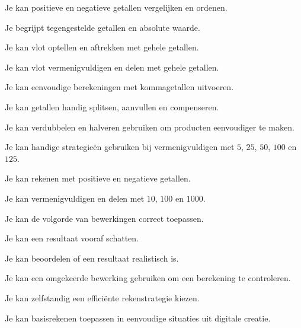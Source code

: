 \documentclass{ximera}
\begin{document}
\begin{leerdoelen}

    \item Je kan positieve en negatieve getallen vergelijken en ordenen.

    \item Je begrijpt tegengestelde getallen en absolute waarde.

    \item Je kan vlot optellen en aftrekken met gehele getallen.

    \item Je kan vlot vermenigvuldigen en delen met gehele getallen.

    \item Je kan eenvoudige berekeningen met kommagetallen uitvoeren.

    \item Je kan getallen handig splitsen, aanvullen en compenseren.

    \item Je kan verdubbelen en halveren gebruiken om producten eenvoudiger te maken.

    \item Je kan handige strategieën gebruiken bij vermenigvuldigen met
          \(5\), \(25\), \(50\), \(100\) en \(125\).

    \item Je kan rekenen met positieve en negatieve getallen.

    \item Je kan vermenigvuldigen en delen met \(10\), \(100\) en \(1000\).

    \item Je kan de volgorde van bewerkingen correct toepassen.

    \item Je kan een resultaat vooraf schatten.

    \item Je kan beoordelen of een resultaat realistisch is.

    \item Je kan een omgekeerde bewerking gebruiken om een berekening te controleren.

    \item Je kan zelfstandig een efficiënte rekenstrategie kiezen.

    \item Je kan basisrekenen toepassen in eenvoudige situaties uit digitale creatie.

\end{leerdoelen}
\end{document}
